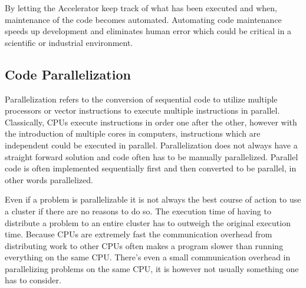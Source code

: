 \documentclass[12pt, a4paper]{article}
\begin{document}
By letting the Accelerator keep track of what has been executed and when, maintenance of the code becomes automated.
Automating code maintenance speeds up development and eliminates human error which could be critical in a scientific or industrial environment.


\subsection{Code Parallelization}

Parallelization refers to the conversion of sequential code to utilize multiple processors or vector instructions to execute multiple instructions in parallel.
Classically, CPUs execute instructions in order one after the other, however with the introduction of multiple cores in computers, instructions which are independent could be executed in parallel.
Parallelization does not always have a straight forward solution and code often has to be manually parallelized.
Parallel code is often implemented sequentially first and then converted to be parallel, in other words parallelized.

Even if a problem is parallelizable it is not always the best course of action to use a cluster if there are no reasons to do so.
The execution time of having to distribute a problem to an entire cluster has to outweigh the original execution time.
Because CPUs are extremely fast the communication overhead from distributing work to other CPUs often makes a program slower than running everything on the same CPU.
There's even a small communication overhead in parallelizing problems on the same CPU, it is however not usually something one has to consider.

\end{document}
